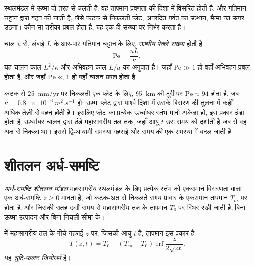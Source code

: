 स्थलमंडल में ऊष्मा दो तरह से चलती है: वह तापमान-प्रवणता की दिशा में विसरित होती है,
और गतिमान चट्टान द्वारा वहन की जाती है, जैसे कटक से निकलती प्लेट, अपरदित
पर्वत का उत्थान, मैग्मा का ऊपर उठना। कौन-सा तरीका प्रबल होता है, यह एक ही
संख्या पर निर्भर करता है।

\begin{definition}[ऊष्मीय पेक्ले संख्या]\label{def:b3:lithosphere-thermal-models:peclet}
चाल $u$ से, लंबाई $L$ के आर-पार गतिमान चट्टान के लिए, \emph{ऊष्मीय पेक्ले
संख्या} होती है
\[
  \mathrm{Pe} = \frac{uL}{\kappa},
\]
यह चालन-काल $L^2/\kappa$ और अभिवहन-काल $L/u$ का अनुपात है।
जहाँ $\mathrm{Pe} \gg 1$ हो वहाँ अभिवहन प्रबल होता है, और जहाँ
$\mathrm{Pe} \ll 1$ हो वहाँ चालन प्रबल होता है।
\end{definition}

कटक से \qty{25}{mm/yr} पर निकलती एक प्लेट के लिए, \qty{95}{km} की दूरी पर
$\mathrm{Pe} \approx 94$ होता है, जब $\kappa = \qty{0.8e-6}{m^2.s^{-1}}$ हो:
ऊष्मा प्लेट द्वारा पार्श्व दिशा में उसके विसरण की तुलना में कहीं अधिक तेज़ी से वहन होती है।
इसलिए प्लेट का प्रत्येक ऊर्ध्वाधर स्तंभ मानो अकेला हो, इस प्रकार ठंडा होता है, ऊर्ध्वाधर
चालन द्वारा ठंडे महासागरीय तल तक, जहाँ आयु $t$ उस समय को दर्शाती है जब से वह
अक्ष से निकला था। इससे द्वि-आयामी समस्या गहराई और
समय की एक समस्या में बदल जाती है।

\section{शीतलन अर्ध-समष्टि}

\begin{definition}\label{def:b3:lithosphere-thermal-models:half-space}
\emph{अर्ध-समष्टि शीतलन मॉडल} महासागरीय स्थलमंडल के लिए
प्रत्येक स्तंभ को एकसमान विसरणता वाला एक अर्ध-समष्टि $z \ge 0$ मानता है, जो कटक-अक्ष
से निकलते समय प्रावार के एकसमान तापमान $T_m$ पर होता है, और जिसकी सतह उसी समय से
महासागरीय तल के तापमान $T_0$ पर स्थिर रखी जाती है, बिना ऊष्मा-उत्पादन और बिना
निचली सीमा के।
\end{definition}

\begin{theorem}[त्रुटि-फलन जियोथर्म]\label{thm:b3:lithosphere-thermal-models:erf}
 में महासागरीय तल के नीचे गहराई $z$ पर,
जिसकी आयु $t$ है, तापमान इस प्रकार है:
\[
  T(z, t) = T_0 + (T_m - T_0)\operatorname{erf}\frac{z}{2\sqrt{\kappa t}} .
\]
यह \emph{त्रुटि-फलन जियोथर्म} है।
\end{theorem}

